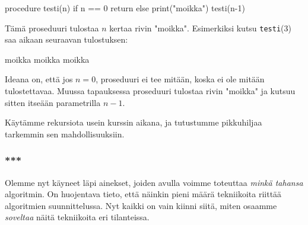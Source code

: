 \begin{code}
procedure testi(n)
    if n == 0
        return
    else
        print("moikka")
        testi(n-1)
\end{code}

Tämä proseduuri tulostaa $n$ kertaa rivin "moikka".
Esimerkiksi kutsu \texttt{testi}(3) saa aikaan seuraavan tulostuksen:

\begin{code}
moikka
moikka
moikka
\end{code}

Ideana on, että jos $n=0$, proseduuri ei tee mitään,
koska ei ole mitään tulostettavaa.
Muussa tapauksessa proseduuri tulostaa rivin "moikka"
ja kutsuu sitten itseään parametrilla $n-1$.

Käytämme rekursiota usein kurssin aikana,
ja tutustumme pikkuhiljaa tarkemmin sen mahdollisuuksiin.

\subsubsection{***}

Olemme nyt käyneet läpi ainekset,
joiden avulla voimme toteuttaa \emph{minkä tahansa} algoritmin.
On huojentava tieto, että näinkin pieni määrä tekniikoita
riittää algoritmien suunnittelussa.
Nyt kaikki on vain kiinni siitä, miten osaamme \emph{soveltaa}
näitä tekniikoita eri tilanteissa.
